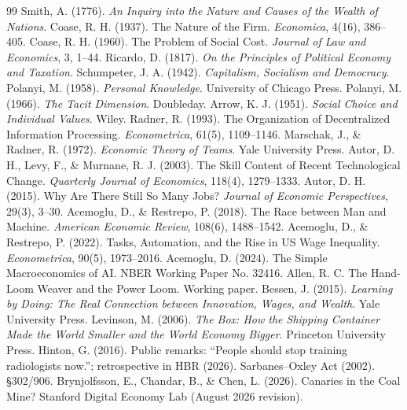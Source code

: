 \documentclass[11pt]{article}
\begin{document}
\begin{thebibliography}{99}\small
{} Smith, A. (1776). \textit{An Inquiry into the Nature and Causes of the Wealth of Nations}.
 Coase, R. H. (1937). The Nature of the Firm. \textit{Economica}, 4(16), 386--405.
 Coase, R. H. (1960). The Problem of Social Cost. \textit{Journal of Law and Economics}, 3, 1--44.
 Ricardo, D. (1817). \textit{On the Principles of Political Economy and Taxation}.
 Schumpeter, J. A. (1942). \textit{Capitalism, Socialism and Democracy}.
 Polanyi, M. (1958). \textit{Personal Knowledge}. University of Chicago Press.
 Polanyi, M. (1966). \textit{The Tacit Dimension}. Doubleday.
 Arrow, K. J. (1951). \textit{Social Choice and Individual Values}. Wiley.
 Radner, R. (1993). The Organization of Decentralized Information Processing. \textit{Econometrica}, 61(5), 1109--1146.
 Marschak, J., \& Radner, R. (1972). \textit{Economic Theory of Teams}. Yale University Press.
 Autor, D. H., Levy, F., \& Murnane, R. J. (2003). The Skill Content of Recent Technological Change. \textit{Quarterly Journal of Economics}, 118(4), 1279--1333.
 Autor, D. H. (2015). Why Are There Still So Many Jobs? \textit{Journal of Economic Perspectives}, 29(3), 3--30.
 Acemoglu, D., \& Restrepo, P. (2018). The Race between Man and Machine. \textit{American Economic Review}, 108(6), 1488--1542.
 Acemoglu, D., \& Restrepo, P. (2022). Tasks, Automation, and the Rise in US Wage Inequality. \textit{Econometrica}, 90(5), 1973--2016.
 Acemoglu, D. (2024). The Simple Macroeconomics of AI. NBER Working Paper No. 32416.
 Allen, R. C. The Hand-Loom Weaver and the Power Loom. Working paper.
 Bessen, J. (2015). \textit{Learning by Doing: The Real Connection between Innovation, Wages, and Wealth}. Yale University Press.
 Levinson, M. (2006). \textit{The Box: How the Shipping Container Made the World Smaller and the World Economy Bigger}. Princeton University Press.
 Hinton, G. (2016). Public remarks: ``People should stop training radiologists now.''; retrospective in HBR (2026).
 Sarbanes--Oxley Act (2002). \S 302/906.
 Brynjolfsson, E., Chandar, B., \& Chen, L. (2026). Canaries in the Coal Mine? Stanford Digital Economy Lab (August 2026 revision).

\end{thebibliography}
\end{document}
